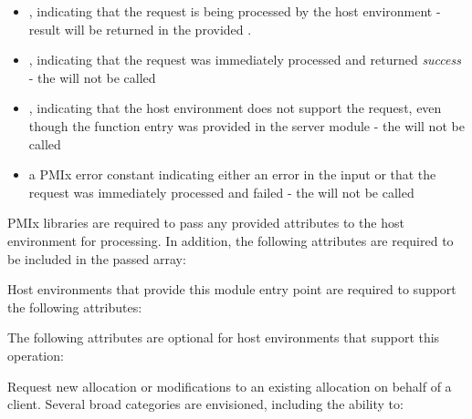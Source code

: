 \begin{itemize}
    \item {}, indicating that the request is being processed by the host environment - result will be returned in the provided .
    \item {}, indicating that the request was immediately processed and returned \textit{success} - the  will not be called
    \item {}, indicating that the host environment does not support the request, even though the function entry was provided in the server module - the  will not be called
    \item a PMIx error constant indicating either an error in the input or that the request was immediately processed and failed - the  will not be called
\end{itemize}

\reqattrstart
\ac{PMIx} libraries are required to pass any provided attributes to the host environment for processing. In addition, the following attributes are required to be included in the passed  array:


\divider

Host environments that provide this module entry point are required to support the following attributes:


\reqattrend

\optattrstart
The following attributes are optional for host environments that support this operation:


\optattrend

\descr

Request new allocation or modifications to an existing allocation on behalf of a client. Several broad categories are envisioned, including the ability to:

